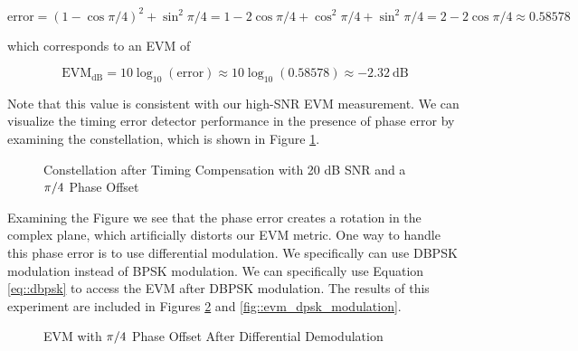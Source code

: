 \documentclass{article}
\begin{document}
\begin{equation}
	\text{error} = (1 - \cos\pi/4)^2 + \sin^2\pi/4 = 1 - 2\cos\pi/4 + \cos^2\pi/4 + \sin^2\pi/4 = 2 - 2\cos\pi/4 \approx 0.58578 
\end{equation}

\noindent which corresponds to an EVM of 

\begin{equation}
	\text{EVM}_{\text{dB}} = 10\log_{10}\left(\text{error}\right) \approx 10\log_{10}(0.58578) \approx -2.32\ \text{dB}
\end{equation}

\noindent Note that this value is consistent with our high-SNR EVM measurement. We can visualize the timing error detector performance in the presence of phase error by examining the constellation, which is shown in Figure \ref{fig::constellation_phase_error}.

\begin{figure}[H]
	\centerline{}
	\caption{Constellation after Timing Compensation with 20 dB SNR and a $\protect\pi/4$ Phase Offset}
	\label{fig::constellation_phase_error}
\end{figure}

\noindent Examining the Figure we see that the phase error creates a rotation in the complex plane, which artificially distorts our EVM metric. One way to handle this phase error is to use differential modulation. We specifically can use DBPSK modulation instead of BPSK modulation. We can specifically use Equation \ref{eq::dbpsk} to access the EVM after DBPSK modulation. The results of this experiment are included in Figures \ref{fig::evm_dpsk_modulation_no_comp} and \ref{fig::evm_dpsk_modulation}.

\begin{figure}[H]
	\centerline{}
	\caption{EVM with $\protect\pi/4$ Phase Offset After Differential Demodulation}
	\label{fig::evm_dpsk_modulation_no_comp}
\end{figure}
\end{document}
